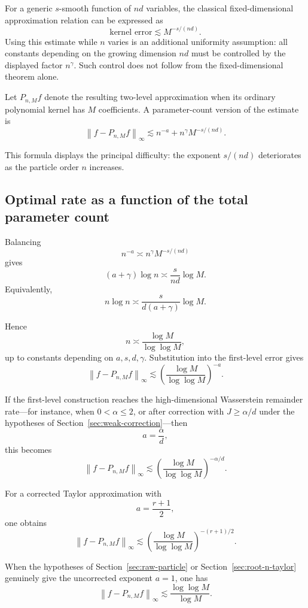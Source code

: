 \documentclass[11pt]{article}
\newcommand{\norm}[1]{\left\lVert #1\right\rVert}
\begin{document}
For a generic \(s\)-smooth function of \(nd\) variables, the classical
fixed-dimensional approximation relation can be expressed as
\[
\text{kernel error}
\lesssim
M^{-s/(nd)}.
\]
Using this estimate while \(n\) varies is an additional uniformity
assumption: all constants depending on the growing dimension \(nd\)
must be controlled by the displayed factor \(n^\gamma\). Such control
does not follow from the fixed-dimensional theorem alone.

Let \(P_{n,M}f\) denote the resulting two-level approximation when its
ordinary polynomial kernel has \(M\) coefficients. A parameter-count
version of the estimate is
\[
\boxed{
\norm{f-P_{n,M}f}_\infty
\lesssim
n^{-a}
+
n^\gamma M^{-s/(nd)}.
}
\]

This formula displays the principal difficulty: the exponent
\(s/(nd)\) deteriorates as the particle order \(n\) increases.

\subsection{Optimal rate as a function of the total parameter count}

Balancing
\[
n^{-a}
\asymp
n^\gamma M^{-s/(nd)}
\]
gives
\[
(a+\gamma)\log n
\asymp
\frac{s}{nd}\log M.
\]
Equivalently,
\[
n\log n
\asymp
\frac{s}{d(a+\gamma)}\log M.
\]

Hence
\[
n
\asymp
\frac{\log M}{\log\log M},
\]
up to constants depending on \(a,s,d,\gamma\). Substitution into the
first-level error gives
\[
\boxed{
\norm{f-P_{n,M}f}_\infty
\lesssim
\left(
\frac{\log M}{\log\log M}
\right)^{-a}.
}
\]

If the first-level construction reaches the high-dimensional
Wasserstein remainder rate---for instance, when
\(0<\alpha\leq2\), or after correction with \(J\geq\alpha/d\) under
the hypotheses of Section~\ref{sec:weak-correction}---then
\[
a=\frac{\alpha}{d},
\]
this becomes
\[
\boxed{
\norm{f-P_{n,M}f}_\infty
\lesssim
\left(
\frac{\log M}{\log\log M}
\right)^{-\alpha/d}.
}
\]

For a corrected Taylor approximation with
\[
a=\frac{r+1}{2},
\]
one obtains
\[
\boxed{
\norm{f-P_{n,M}f}_\infty
\lesssim
\left(
\frac{\log M}{\log\log M}
\right)^{-(r+1)/2}.
}
\]

When the hypotheses of Section~\ref{sec:raw-particle} or
Section~\ref{sec:root-n-taylor} genuinely give the uncorrected exponent
\(a=1\), one has
\[
\boxed{
\norm{f-P_{n,M}f}_\infty
\lesssim
\frac{\log\log M}{\log M}.
}
\]
\end{document}
